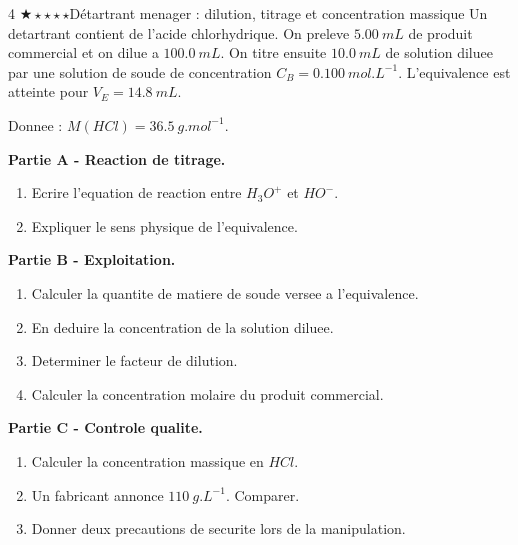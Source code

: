 \documentclass[11pt,a4paper]{article}
\newcommand{\diffone}{\(\bigstar\star\star\star\star\)}
\begin{document}
\begin{probleme}{4 \diffone}{Détartrant menager : dilution, titrage et concentration massique}
Un detartrant contient de l'acide chlorhydrique. On preleve \(\SI{5.00}{mL}\) de produit commercial et on dilue a \(\SI{100.0}{mL}\). On titre ensuite \(\SI{10.0}{mL}\) de solution diluee par une solution de soude de concentration \(C_B=\SI{0.100}{mol.L^{-1}}\). L'equivalence est atteinte pour \(V_E=\SI{14.8}{mL}\).

Donnee : \(M(HCl)=\SI{36.5}{g.mol^{-1}}\).

\textbf{Partie A - Reaction de titrage.}
\begin{enumerate}
\item Ecrire l'equation de reaction entre \(H_3O^+\) et \(HO^-\).
\item Expliquer le sens physique de l'equivalence.
\end{enumerate}

\textbf{Partie B - Exploitation.}
\begin{enumerate}[resume]
\item Calculer la quantite de matiere de soude versee a l'equivalence.
\item En deduire la concentration de la solution diluee.
\item Determiner le facteur de dilution.
\item Calculer la concentration molaire du produit commercial.
\end{enumerate}

\textbf{Partie C - Controle qualite.}
\begin{enumerate}[resume]
\item Calculer la concentration massique en \(HCl\).
\item Un fabricant annonce \(\SI{110}{g.L^{-1}}\). Comparer.
\item Donner deux precautions de securite lors de la manipulation.
\end{enumerate}
\end{probleme}
\end{document}
